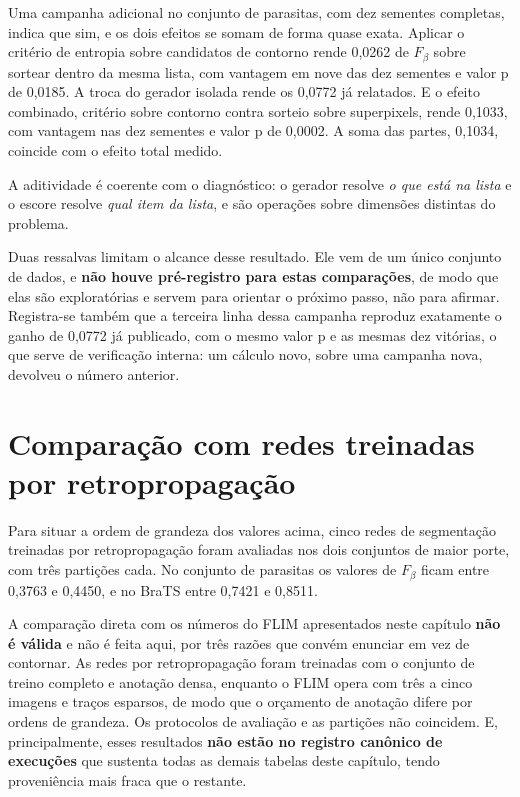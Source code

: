 Uma campanha adicional no conjunto de parasitas, com dez sementes completas, indica que sim, e os dois efeitos se somam de forma quase exata. Aplicar o critério de entropia sobre candidatos de contorno rende 0,0262 de $F_\beta$ sobre sortear dentro da mesma lista, com vantagem em nove das dez sementes e valor p de 0,0185. A troca do gerador isolada rende os 0,0772 já relatados. E o efeito combinado, critério sobre contorno contra sorteio sobre superpixels, rende 0,1033, com vantagem nas dez sementes e valor p de 0,0002. A soma das partes, 0,1034, coincide com o efeito total medido.

A aditividade é coerente com o diagnóstico: o gerador resolve \emph{o que está na lista} e o escore resolve \emph{qual item da lista}, e são operações sobre dimensões distintas do problema.

Duas ressalvas limitam o alcance desse resultado. Ele vem de um único conjunto de dados, e \textbf{não houve pré-registro para estas comparações}, de modo que elas são exploratórias e servem para orientar o próximo passo, não para afirmar. Registra-se também que a terceira linha dessa campanha reproduz exatamente o ganho de 0,0772 já publicado, com o mesmo valor p e as mesmas dez vitórias, o que serve de verificação interna: um cálculo novo, sobre uma campanha nova, devolveu o número anterior.

\section{Comparação com redes treinadas por retropropagação}

Para situar a ordem de grandeza dos valores acima, cinco redes de segmentação treinadas por retropropagação foram avaliadas nos dois conjuntos de maior porte, com três partições cada. No conjunto de parasitas os valores de $F_\beta$ ficam entre 0,3763 e 0,4450, e no BraTS entre 0,7421 e 0,8511.

A comparação direta com os números do \ac{FLIM} apresentados neste capítulo \textbf{não é válida} e não é feita aqui, por três razões que convém enunciar em vez de contornar. As redes por retropropagação foram treinadas com o conjunto de treino completo e anotação densa, enquanto o \ac{FLIM} opera com três a cinco imagens e traços esparsos, de modo que o orçamento de anotação difere por ordens de grandeza. Os protocolos de avaliação e as partições não coincidem. E, principalmente, esses resultados \textbf{não estão no registro canônico de execuções} que sustenta todas as demais tabelas deste capítulo, tendo proveniência mais fraca que o restante.

